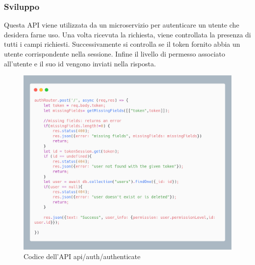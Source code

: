 \documentclass{report}
\begin{document}
\subsubsection*{Sviluppo}
Questa API viene utilizzata da un microservizio per autenticare un utente che desidera farne uso.
Una volta ricevuta la richiesta, viene controllata la presenza di tutti i campi richiesti.
Successivamente si controlla se il token fornito abbia un utente corrispondente nella sessione.
Infine il livello di permesso associato all'utente e il suo id vengono inviati nella risposta.
\begin{figure}[H]
	\centering\includegraphics[width=1\textwidth]{images/microservizio-autenticazione/authenticate-carbon.png}
	Codice dell'API api/auth/authenticate
\end{figure}
\end{document}
